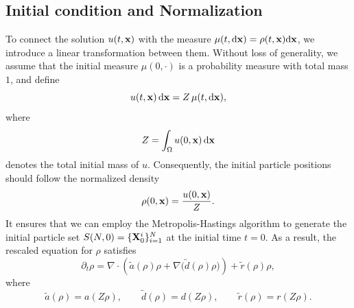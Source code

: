 \documentclass[12pt]{article}
\begin{document}
\subsection{Initial condition and Normalization}
To connect the solution $u(t,\mathbf{x})$ with the measure $\mu(t,\mathrm{d}\mathbf{x})=\rho(t,\mathbf{x}) \mathrm{d} \mathbf{x}$, we introduce a linear transformation between them. 
Without loss of generality, we assume that the initial measure $\mu(0,\cdot)$ is a probability measure with total mass $1$, and define
\begin{equation*}
    u(t,\mathbf{x})\,\mathrm{d}\mathbf{x} = Z \,\mu(t,\mathrm{d}\mathbf{x}),
\end{equation*}
where 
\[
Z = \int_{\Omega} u(0,\mathbf{x})\,\mathrm{d}\mathbf{x}
\]
denotes the total initial mass of $u$.
Consequently, the initial particle positions should follow the normalized density
\[
\rho(0,\mathbf{x}) = \frac{u(0,\mathbf{x})}{Z}.
\]
It ensures that we can employ the Metropolis-Hastings algorithm to generate the initial particle set $S(N,0)= \{\mathbf{X}_0^i\}_{i=1}^{N}$ at the initial time $t=0$.
As a result, the rescaled equation for $\rho$ satisfies
\begin{equation}\label{equ:normalized_diffusion_reaction}
\partial_t \rho 
= \nabla \cdot \left( \tilde a(\rho)\rho + \nabla \big(\tilde d(\rho)\rho \big)\right) 
  + \tilde r(\rho)\rho,
\end{equation}
where
\[
\tilde a(\rho) = a(Z\rho), 
\qquad \tilde d(\rho) = d(Z\rho), 
\qquad \tilde r(\rho) = r(Z\rho).
\]
\end{document}
